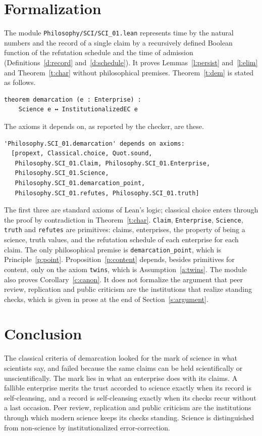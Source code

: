 \documentclass{situationist-preprint}
\begin{document}
\section{Formalization}\label{s:lean}

The module \nolinkurl{Philosophy/SCI/SCI_01.lean} represents time by the natural numbers and the record of a single claim by a recursively defined Boolean function of the refutation schedule and the time of admission (Definitions~\ref{d:record} and~\ref{d:schedule}). It proves Lemmas~\ref{l:persist} and~\ref{l:elim} and Theorem~\ref{t:char} without philosophical premises. Theorem~\ref{t:dem} is stated as follows.

\begin{lstlisting}
theorem demarcation (e : Enterprise) :
    Science e ↔ InstitutionalizedEC e
\end{lstlisting}

The axioms it depends on, as reported by the checker, are these.

\begin{lstlisting}
'Philosophy.SCI_01.demarcation' depends on axioms:
  [propext, Classical.choice, Quot.sound,
   Philosophy.SCI_01.Claim, Philosophy.SCI_01.Enterprise,
   Philosophy.SCI_01.Science,
   Philosophy.SCI_01.demarcation_point,
   Philosophy.SCI_01.refutes, Philosophy.SCI_01.truth]
\end{lstlisting}

The first three are standard axioms of Lean's logic; classical choice enters through the proof by contradiction in Theorem~\ref{t:char}. \texttt{Claim}, \texttt{Enterprise}, \texttt{Science}, \texttt{truth} and \texttt{refutes} are primitives: claims, enterprises, the property of being a science, truth values, and the refutation schedule of each enterprise for each claim. The only philosophical premise is \texttt{demarcation\_point}, which is Principle~\ref{p:point}. Proposition~\ref{p:content} depends, besides primitives for content, only on the axiom \texttt{twins}, which is Assumption~\ref{a:twins}. The module also proves Corollary~\ref{c:canon}. It does not formalize the argument that peer review, replication and public criticism are the institutions that realize standing checks, which is given in prose at the end of Section~\ref{s:argument}.

\section{Conclusion}

The classical criteria of demarcation looked for the mark of science in what scientists say, and failed because the same claims can be held scientifically or unscientifically. The mark lies in what an enterprise does with its claims. A fallible enterprise merits the trust accorded to science exactly when its record is self-cleansing, and a record is self-cleansing exactly when its checks recur without a last occasion. Peer review, replication and public criticism are the institutions through which modern science keeps its checks standing. Science is distinguished from non-science by institutionalized error-correction.
\end{document}
